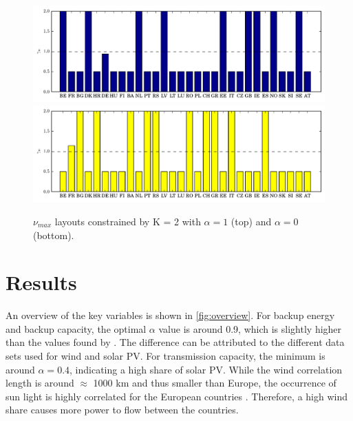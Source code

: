 \documentclass[a4paper, 12pt, sort&compress]{elsarticle}%
\newcommand{\chromowidth}{1.05 \columnwidth}
\begin{document}
\begin{figure}[h!]
  \centering
  \includegraphics[width = \chromowidth, center]{k=2cfMaxWind}
  \includegraphics[width = \chromowidth, center]{k=2cfMaxSolar}
  \caption{$\nu_{max}$ layouts constrained by K = 2 with $\alpha = 1$ (top) and $\alpha = 0$ (bottom).}
  \label{fig:max2}
\end{figure}





\section{Results}
\label{sec:results}

An overview of the key variables is shown in \cref{fig:overview}. For
backup energy and backup capacity, the optimal $\alpha$ value is around
0.9, which is slightly higher than the values found by
\cite{Heide2010,Heide2011}. The difference can be attributed to the
different data sets used for wind and solar PV. For transmission
capacity, the minimum is around $\alpha = 0.4$, indicating a high share of
solar PV. While the wind correlation length is around $\approx$ 1000
km \cite{Widen2011} and thus smaller than Europe, the occurrence of
sun light is highly correlated for the European countries
\cite{Timo}. Therefore, a high wind share causes more power to flow
between the countries.
\end{document}
